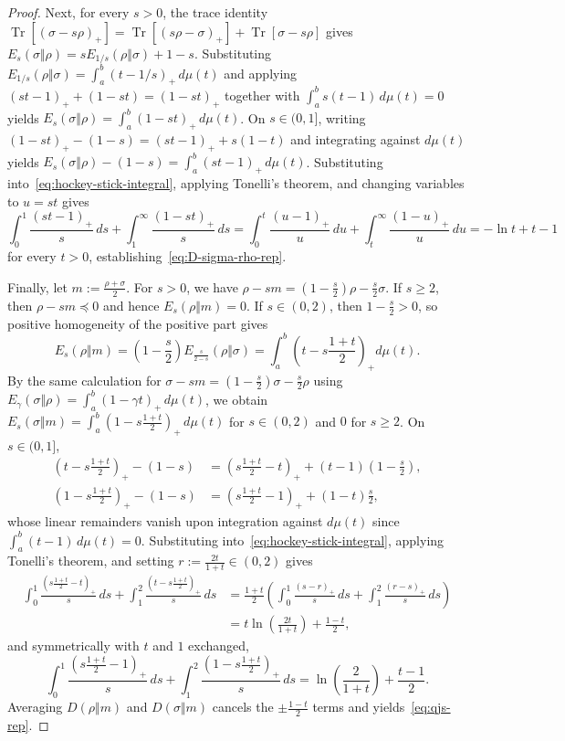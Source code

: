 \documentclass[10pt,a4paper]{article}
\numberwithin{equation}{section}
\theoremstyle{plain}
\theoremstyle{definition}
\theoremstyle{remark}
\DeclareMathOperator{\Tr}{Tr}
\begin{document}
\begin{proof}
Next, for every $s > 0$, the trace identity $\Tr[(\sigma - s\rho)_+] = \Tr[(s\rho - \sigma)_+] + \Tr[\sigma - s\rho]$ gives $E_s(\sigma \Vert \rho) = s E_{1/s}(\rho \Vert \sigma) + 1 - s$. Substituting $E_{1/s}(\rho \Vert \sigma) = \int_a^b (t - 1/s)_+\, d\mu(t)$ and applying $(st - 1)_+ + (1 - st) = (1 - st)_+$ together with $\int_a^b s(t - 1)\, d\mu(t) = 0$ yields $E_s(\sigma \Vert \rho) = \int_a^b (1 - st)_+\, d\mu(t)$. On $s \in (0,1]$, writing $(1 - st)_+ - (1 - s) = (st - 1)_+ + s(1 - t)$ and integrating against $d\mu(t)$ yields $E_s(\sigma \Vert \rho) - (1 - s) = \int_a^b (st - 1)_+\, d\mu(t)$. Substituting into~\eqref{eq:hockey-stick-integral}, applying Tonelli's theorem, and changing variables to $u = st$ gives
\[
\int_0^1 \frac{(st - 1)_+}{s}\, ds + \int_1^{\infty} \frac{(1 - st)_+}{s}\, ds = \int_0^t \frac{(u - 1)_+}{u}\, du + \int_t^{\infty} \frac{(1 - u)_+}{u}\, du = -\ln t + t - 1
\]
for every $t > 0$, establishing~\eqref{eq:D-sigma-rho-rep}.

Finally, let $m := \frac{\rho + \sigma}{2}$. For $s > 0$, we have $\rho - sm = (1 - \frac{s}{2})\rho - \frac{s}{2}\sigma$. If $s \ge 2$, then $\rho - sm \preceq 0$ and hence $E_s(\rho \Vert m) = 0$. If $s \in (0,2)$, then $1 - \frac{s}{2} > 0$, so positive homogeneity of the positive part gives
\begin{equation}\label{eq:midpoint-hockey}
E_s(\rho \Vert m) = \left(1 - \frac{s}{2}\right) E_{\frac{s}{2-s}}(\rho \Vert \sigma) = \int_a^b \left(t - s\frac{1+t}{2}\right)_+ d\mu(t).
\end{equation}
By the same calculation for $\sigma - sm = (1 - \frac{s}{2})\sigma - \frac{s}{2}\rho$ using $E_\gamma(\sigma \Vert \rho) = \int_a^b (1 - \gamma t)_+\, d\mu(t)$, we obtain $E_s(\sigma \Vert m) = \int_a^b (1 - s\frac{1+t}{2})_+\, d\mu(t)$ for $s \in (0,2)$ and $0$ for $s \ge 2$. On $s \in (0,1]$,
\begin{align*}
\left(t - s\frac{1+t}{2}\right)_+ - (1 - s) &= \left(s\frac{1+t}{2} - t\right)_+ + (t - 1)\left(1 - \frac{s}{2}\right),\\
\left(1 - s\frac{1+t}{2}\right)_+ - (1 - s) &= \left(s\frac{1+t}{2} - 1\right)_+ + (1 - t)\frac{s}{2},
\end{align*}
whose linear remainders vanish upon integration against $d\mu(t)$ since $\int_a^b (t - 1)\, d\mu(t) = 0$. Substituting into~\eqref{eq:hockey-stick-integral}, applying Tonelli's theorem, and setting $r := \frac{2t}{1+t} \in (0,2)$ gives
\begin{align*}
\int_0^1 \frac{(s\frac{1+t}{2} - t)_+}{s}\, ds + \int_1^2 \frac{(t - s\frac{1+t}{2})_+}{s}\, ds
&= \frac{1+t}{2}\left(\int_0^1 \frac{(s - r)_+}{s}\, ds + \int_1^2 \frac{(r - s)_+}{s}\, ds\right)\\
&= t\ln\!\left(\frac{2t}{1+t}\right) + \frac{1 - t}{2},
\end{align*}
and symmetrically with $t$ and $1$ exchanged,
\[
\int_0^1 \frac{(s\frac{1+t}{2} - 1)_+}{s}\, ds + \int_1^2 \frac{(1 - s\frac{1+t}{2})_+}{s}\, ds
= \ln\!\left(\frac{2}{1+t}\right) + \frac{t - 1}{2}.
\]
Averaging $D(\rho \Vert m)$ and $D(\sigma \Vert m)$ cancels the $\pm\frac{1-t}{2}$ terms and yields~\eqref{eq:qjs-rep}.
\end{proof}
\end{document}
